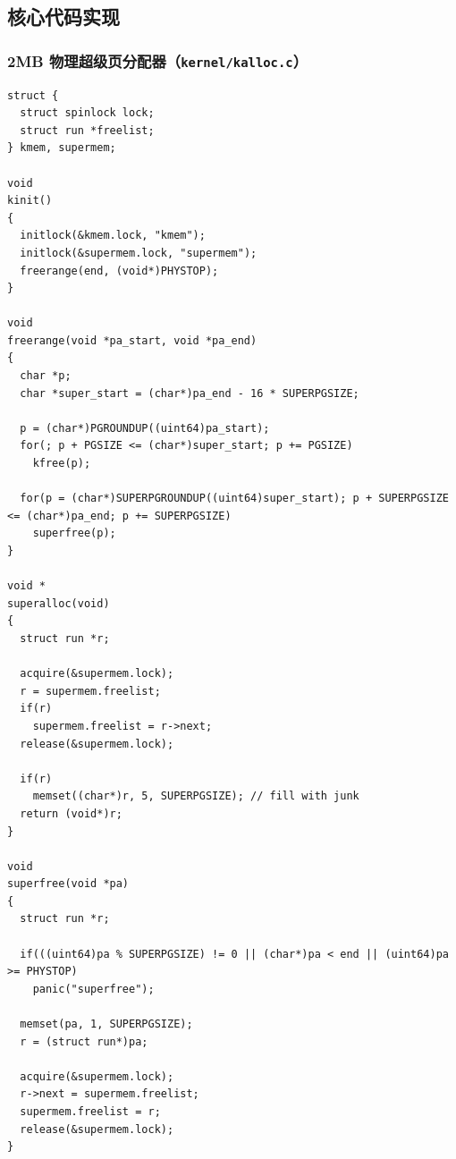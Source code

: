 \documentclass[12pt, a4paper]{ctexart}
\begin{document}
\subsection{核心代码实现}

\subsubsection{2MB 物理超级页分配器（\texttt{kernel/kalloc.c}）}
\begin{lstlisting}[caption={\texttt{kernel/kalloc.c} 中预留 2MB 超级页与 \texttt{superalloc}/\texttt{superfree} 实现}]
struct {
  struct spinlock lock;
  struct run *freelist;
} kmem, supermem;

void
kinit()
{
  initlock(&kmem.lock, "kmem");
  initlock(&supermem.lock, "supermem");
  freerange(end, (void*)PHYSTOP);
}

void
freerange(void *pa_start, void *pa_end)
{
  char *p;
  char *super_start = (char*)pa_end - 16 * SUPERPGSIZE;

  p = (char*)PGROUNDUP((uint64)pa_start);
  for(; p + PGSIZE <= (char*)super_start; p += PGSIZE)
    kfree(p);

  for(p = (char*)SUPERPGROUNDUP((uint64)super_start); p + SUPERPGSIZE <= (char*)pa_end; p += SUPERPGSIZE)
    superfree(p);
}

void *
superalloc(void)
{
  struct run *r;

  acquire(&supermem.lock);
  r = supermem.freelist;
  if(r)
    supermem.freelist = r->next;
  release(&supermem.lock);

  if(r)
    memset((char*)r, 5, SUPERPGSIZE); // fill with junk
  return (void*)r;
}

void
superfree(void *pa)
{
  struct run *r;

  if(((uint64)pa % SUPERPGSIZE) != 0 || (char*)pa < end || (uint64)pa >= PHYSTOP)
    panic("superfree");

  memset(pa, 1, SUPERPGSIZE);
  r = (struct run*)pa;

  acquire(&supermem.lock);
  r->next = supermem.freelist;
  supermem.freelist = r;
  release(&supermem.lock);
}
\end{lstlisting}
\end{document}
